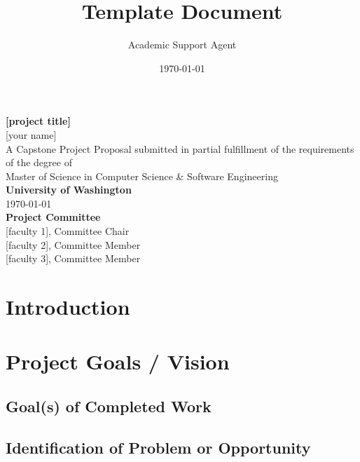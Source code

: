 \documentclass{article}
\title{Template Document}
\author{Academic Support Agent}
\date{\today}
\begin{document}
\maketitle

\def\course{A Capstone Project Proposal
submitted in partial fulfillment of the
requirements of the degree of
}      %
\def\degree{Master of Science in Computer Science \& Software Engineering}
\def\thetitle{[project title]}               %
\def\date{\today}
\begin{center}
    {\Large\textbf{{\thetitle}}}\\[.5cm]
    {\Large{[your name]}}\\[3cm]
    
    {\Large{\course}}\\[.5cm]
    {\Large{\degree}}\\[3cm]
   
    {\color[RGB]{51, 0, 111}\Large{\textbf{University of Washington}}}\\[.5cm]
     {\date}\\[3cm]

    {\Large{\textbf{Project Committee}}}\\[.5cm]
     {[faculty 1], Committee Chair}\\[.5cm]
     {[faculty 2], Committee Member}\\[.5cm]
     {[faculty 3], Committee Member}\\[.5cm]
   
\end{center}
\thispagestyle{empty}
\pagebreak

\section{Introduction}

\section{Project Goals / Vision}
\subsection{Goal(s) of Completed Work}

\subsection{Identification of Problem or Opportunity}
\end{document}
